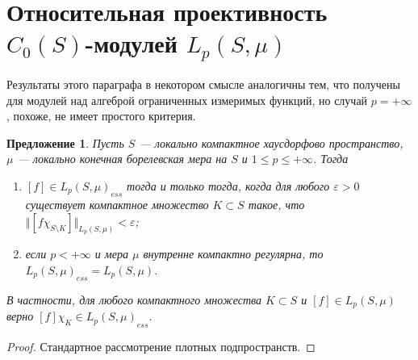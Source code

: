 \documentclass[12pt]{article}
\newtheorem{proposition}[theorem]{Предложение}
\begin{document}

\section{Относительная проективность \texorpdfstring{$C_0(S)$}{C0S}-модулей
  \texorpdfstring{$L_p(S,\mu)$}{LpSmu}
 }\label{SectionRelativeProjectivityOfC0SModulesLpSmu}

Результаты этого параграфа в некотором смысле аналогичны тем, что получены для
модулей над алгеброй ограниченных измеримых функций, но случай $p=+\infty$,
похоже, не имеет простого критерия.

\begin{proposition}\label{LpEssC0ModCharac} Пусть $S$ --- локально компактное
    хаусдорфово пространство, $\mu$ --- локально конечная борелевская мера на
    $S$ и $1\leq p\leq+\infty$. Тогда
    \begin{enumerate}[label = (\roman*)]
        \item $[f]\in {L_p(S,\mu)}_{ess}$ тогда и только тогда, когда для любого
              $\varepsilon >0$ существует компактное множество $K\subset S$
              такое, что $\Vert [f\chi_{S\setminus K}]\Vert_{L_p(S,\mu)}<
                  \varepsilon$;

        \item если $p<+\infty$ и мера $\mu$ внутренне компактно регулярна, то
              ${L_p(S,\mu)}_{ess}=L_p(S,\mu)$.
    \end{enumerate}

    В частности, для любого компактного множества $K\subset S$ и $[f]\in
        L_p(S,\mu)$ верно $[f]\chi_K\in {L_p(S,\mu)}_{ess}$.
\end{proposition}
\begin{proof} Стандартное рассмотрение плотных подпространств.
\end{proof}
\end{document}
